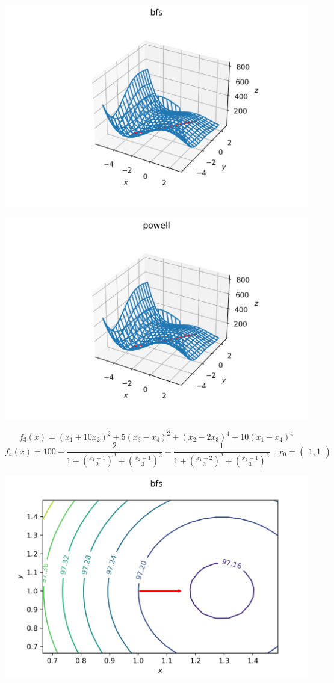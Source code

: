 \documentclass[english]{article}
\begin{document}
\begin{center}
  \includegraphics[scale=0.7]{plots/3D_bfs_7.png}
\end{center}
\begin{center}
  \includegraphics[scale=0.7]{plots/3D_powell_7.png}
\end{center}
\[ f_3(x) = (x_1 + 10x_2)^2 + 5(x_3 - x_4)^2 + (x_2 - 2x_3)^4 + 10(x_1 - x_4)^4 \]
\[ f_4(x) = 100 - \frac{2}{1 + \left(\frac{x_1 - 1}{2}\right)^2 + \left(\frac{x_2 - 1}{3}\right)^2} - \frac{1}{1 + \left(\frac{x_1 - 2}{2}\right)^2 + \left(\frac{x_2 - 1}{3}\right)^2} \quad x_0 = \begin{pmatrix}
  1, 1
\end{pmatrix}\]
\begin{center}
  \includegraphics[scale=0.7]{plots/contours_bfs_9.png}
\end{center}
\end{document}
